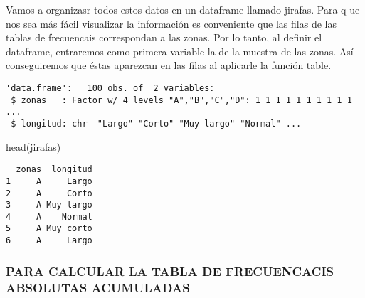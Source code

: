 \documentclass[
]{article}
\newenvironment{Shaded}{\begin{snugshade}}{\end{snugshade}}
\newcommand{\DecValTok}[1]{\textcolor[rgb]{0.00,0.00,0.81}{#1}}
\newcommand{\FunctionTok}[1]{\textcolor[rgb]{0.00,0.00,0.00}{#1}}
\newcommand{\NormalTok}[1]{#1}
\newcommand{\OtherTok}[1]{\textcolor[rgb]{0.56,0.35,0.01}{#1}}
\newcommand{\SpecialCharTok}[1]{\textcolor[rgb]{0.00,0.00,0.00}{#1}}
\newcommand{\StringTok}[1]{\textcolor[rgb]{0.31,0.60,0.02}{#1}}
\begin{document}
Vamos a organizasr todos estos datos en un dataframe llamado jirafas.
Para q ue nos sea más fácil visualizar la información es conveniente que
las filas de las tablas de frecuencais correspondan a las zonas. Por lo
tanto, al definir el dataframe, entraremos como primera variable la de
la muestra de las zonas. Así conseguiremos que éstas aparezcan en las
filas al aplicarle la función table.

\begin{Shaded}
\end{Shaded}

\begin{verbatim}
'data.frame':   100 obs. of  2 variables:
 $ zonas   : Factor w/ 4 levels "A","B","C","D": 1 1 1 1 1 1 1 1 1 1 ...
 $ longitud: chr  "Largo" "Corto" "Muy largo" "Normal" ...
\end{verbatim}

\begin{Shaded}
\begin{Highlighting}[]
\FunctionTok{head}\NormalTok{(jirafas)}
\end{Highlighting}
\end{Shaded}

\begin{verbatim}
  zonas  longitud
1     A     Largo
2     A     Corto
3     A Muy largo
4     A    Normal
5     A Muy corto
6     A     Largo
\end{verbatim}

\hypertarget{para-calcular-la-tabla-de-frecuencacis-absolutas-acumuladas}{%
\subsubsection{PARA CALCULAR LA TABLA DE FRECUENCACIS ABSOLUTAS
ACUMULADAS}\label{para-calcular-la-tabla-de-frecuencacis-absolutas-acumuladas}}
\end{document}
